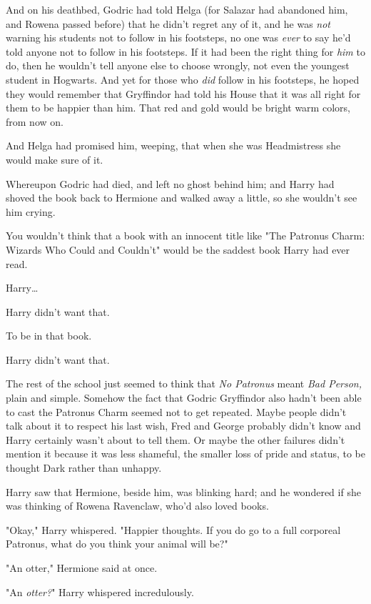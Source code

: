 And on his deathbed, Godric had told Helga (for Salazar had abandoned him, and 
Rowena passed before) that he didn't regret any of it, and he was \emph{not} 
warning his students not to follow in his footsteps, no one was \emph{ever} to 
say he'd told anyone not to follow in his footsteps. If it had been the right 
thing for \emph{him} to do, then he wouldn't tell anyone else to choose 
wrongly, not even the youngest student in Hogwarts. And yet for those who 
\emph{did} follow in his footsteps, he hoped they would remember that 
Gryffindor had told his House that it was all right for them to be happier than 
him. That red and gold would be bright warm colors, from now on.

And Helga had promised him, weeping, that when she was Headmistress she would 
make sure of it.

Whereupon Godric had died, and left no ghost behind him; and Harry had shoved 
the book back to Hermione and walked away a little, so she wouldn't see him 
crying.

You wouldn't think that a book with an innocent title like "The Patronus Charm: 
Wizards Who Could and Couldn't" would be the saddest book Harry had ever read.

Harry{\ldots}

Harry didn't want that.

To be in that book.

Harry didn't want that.

The rest of the school just seemed to think that \emph{No Patronus} meant 
\emph{Bad Person,} plain and simple. Somehow the fact that Godric Gryffindor 
also hadn't been able to cast the Patronus Charm seemed not to get repeated. 
Maybe people didn't talk about it to respect his last wish, Fred and George 
probably didn't know and Harry certainly wasn't about to tell them. Or maybe 
the other failures didn't mention it because it was less shameful, the smaller 
loss of pride and status, to be thought Dark rather than unhappy.

Harry saw that Hermione, beside him, was blinking hard; and he wondered if she 
was thinking of Rowena Ravenclaw, who'd also loved books.

"Okay," Harry whispered. "Happier thoughts. If you do go to a full corporeal 
Patronus, what do you think your animal will be?"

"An otter," Hermione said at once.

"An \emph{otter?}" Harry whispered incredulously.

